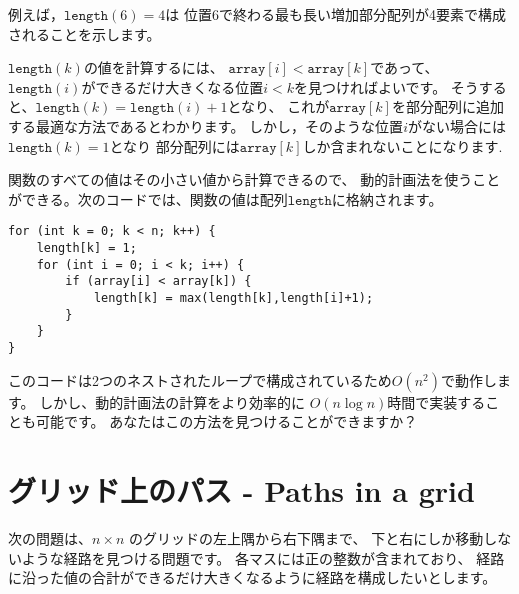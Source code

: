 例えば，$\texttt{length}(6)=4$は
位置6で終わる最も長い増加部分配列が4要素で構成されることを示します。

$\texttt{length}(k)$の値を計算するには、
$\texttt{array}[i]<\texttt{array}[k]$であって、
$\texttt{length}(i)$ができるだけ大きくなる位置$i < k$を見つければよいです。
そうすると、$\texttt{length}(k)=\texttt{length}(i)+1$となり、
これが$\texttt{array}[k]$を部分配列に追加する最適な方法であるとわかります。
しかし，そのような位置$i$がない場合には$\texttt{length}(k)=1$となり
部分配列には$\texttt{array}[k]$しか含まれないことになります.

関数のすべての値はその小さい値から計算できるので、
動的計画法を使うことができる。次のコードでは、関数の値は配列$\texttt{length}$に格納されます。

\begin{lstlisting}
for (int k = 0; k < n; k++) {
    length[k] = 1;
    for (int i = 0; i < k; i++) {
        if (array[i] < array[k]) {
            length[k] = max(length[k],length[i]+1);
        }
    }
}
\end{lstlisting}

このコードは2つのネストされたループで構成されているため$O(n^2)$で動作します。
しかし、動的計画法の計算をより効率的に $O(n \log n)$時間で実装することも可能です。
あなたはこの方法を見つけることができますか？

\section{グリッド上のパス - Paths in a grid}

次の問題は、$n \times n$ のグリッドの左上隅から右下隅まで、
下と右にしか移動しないような経路を見つける問題です。
各マスには正の整数が含まれており、
経路に沿った値の合計ができるだけ大きくなるように経路を構成したいとします。

